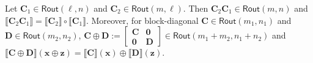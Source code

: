 \documentclass{article}
\newcommand{\vect}[1]{\mathbf{#1}}           %
\newcommand{\mat}[1]{\mathbf{#1}}            %
\newcommand{\zeros}{\mat{0}}                 %
\newcommand{\Rout}[2]{\mathsf{Rout}(#1,#2)}
\begin{document}
\begin{proposition}
Let $\mat{C}_1\in\Rout{\ell}{n}$ and $\mat{C}_2\in\Rout{m}{\ell}$. Then $\mat{C}_2\mat{C}_1\in\Rout{m}{n}$ and
$\llbracket \mat{C}_2\mat{C}_1\rrbracket=\llbracket \mat{C}_2\rrbracket\circ\llbracket \mat{C}_1\rrbracket$.
Moreover, for block-diagonal $\mat{C}\in\Rout{m_1}{n_1}$ and $\mat{D}\in\Rout{m_2}{n_2}$,
$\mat{C}\oplus\mat{D}:=\begin{bmatrix}\mat{C}&\zeros\\ \zeros&\mat{D}\end{bmatrix}\in\Rout{m_1{+}m_2}{n_1{+}n_2}$ and
$\llbracket \mat{C}\oplus\mat{D}\rrbracket(\vect{x}\oplus\vect{z})=\llbracket \mat{C}\rrbracket(\vect{x})\oplus\llbracket \mat{D}\rrbracket(\vect{z})$.
\end{proposition}
\end{document}
